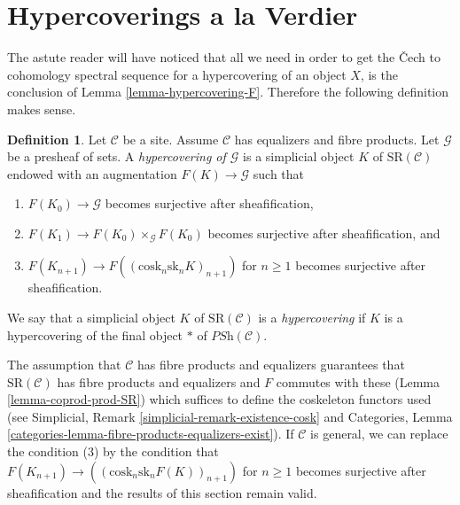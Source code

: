 \documentclass{stacks-project}
\theoremstyle{plain}
\theoremstyle{definition}
\newtheorem{definition}[subsection]{Definition}
\theoremstyle{remark}
\numberwithin{equation}{subsection}
\begin{document}
\section{Hypercoverings a la Verdier}
\label{section-hypercoverings-verdier}

\noindent
The astute reader will have noticed that all we need in order
to get the {\v C}ech to cohomology spectral sequence for a
hypercovering of an object $X$, is the
conclusion of Lemma \ref{lemma-hypercovering-F}.
Therefore the following definition makes sense.

\begin{definition}
\label{definition-hypercovering-variant}
Let $\mathcal{C}$ be a site. Assume $\mathcal{C}$ has equalizers
and fibre products. Let $\mathcal{G}$ be a presheaf of sets.
A {\it hypercovering of $\mathcal{G}$} is a simplicial object
$K$ of $\text{SR}(\mathcal{C})$ endowed with an augmentation
$F(K) \to \mathcal{G}$ such that
\begin{enumerate}
\item $F(K_0) \to \mathcal{G}$ becomes surjective
after sheafification,
\item $F(K_1) \to F(K_0) \times_\mathcal{G} F(K_0)$
becomes surjective after sheafification, and
\item $F(K_{n + 1}) \longrightarrow F((\text{cosk}_n \text{sk}_n K)_{n + 1})$
for $n \geq 1$ becomes surjective after sheafification.
\end{enumerate}
We say that a simplicial object $K$ of $\text{SR}(\mathcal{C})$
is a {\it hypercovering} if $K$ is a hypercovering of the final
object $*$ of $\textit{PSh}(\mathcal{C})$.
\end{definition}

\noindent
The assumption that $\mathcal{C}$ has fibre products and equalizers
guarantees that $\text{SR}(\mathcal{C})$ has fibre products
and equalizers and $F$ commutes with these
(Lemma \ref{lemma-coprod-prod-SR}) which suffices
to define the coskeleton functors used (see
Simplicial, Remark \ref{simplicial-remark-existence-cosk} and
Categories, Lemma \ref{categories-lemma-fibre-products-equalizers-exist}).
If $\mathcal{C}$ is general, we can replace the condition (3) by the
condition that
$F(K_{n + 1}) \longrightarrow ((\text{cosk}_n \text{sk}_n F(K))_{n + 1})$
for $n \geq 1$ becomes surjective after sheafification and the
results of this section remain valid.
\end{document}
